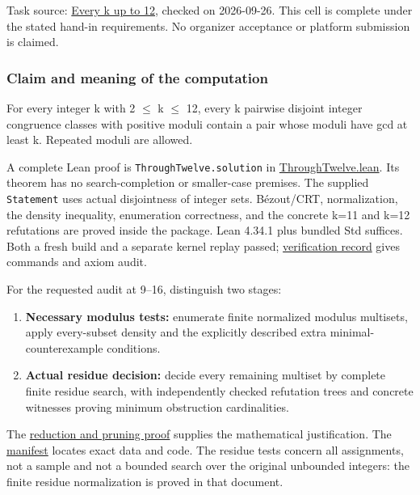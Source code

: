 \documentclass[11pt,a4paper]{article}
\providecommand{\tightlist}{\setlength{\itemsep}{0pt}\setlength{\parskip}{0pt}}
\begin{document}
Task source: \href{https://hackathon.bainsa.ai/p/p4/c4}{Every k up to 12}, checked on 2026-09-26. This cell is complete under the stated hand-in requirements. No organizer acceptance or platform submission is claimed.

\subsubsection{Claim and meaning of the computation}\label{claim-and-meaning-of-the-computation}

For every integer k with 2 \ensuremath{\leq} k \ensuremath{\leq} 12, every k pairwise disjoint integer congruence classes with positive moduli contain a pair whose moduli have gcd at least k. Repeated moduli are allowed.

A complete Lean proof is \texttt{ThroughTwelve.solution} in \href{https://github.com/mpelteshki/climbing-to-the-frontier/blob/ed55f76eb8c558825bb629fd2cd8dbf46e5f1314/cagent/p4/lean/ProofPursuit/P4/ThroughTwelve.lean}{ThroughTwelve.lean}. Its theorem has no search-completion or smaller-case premises. The supplied \texttt{Statement} uses actual disjointness of integer sets. B\'{e}zout/CRT, normalization, the density inequality, enumeration correctness, and the concrete k=11 and k=12 refutations are proved inside the package. Lean 4.34.1 plus bundled Std suffices. Both a fresh build and a separate kernel replay passed; \href{https://github.com/mpelteshki/climbing-to-the-frontier/blob/ed55f76eb8c558825bb629fd2cd8dbf46e5f1314/cagent/p4/verification.md}{verification record} gives commands and axiom audit.

For the requested audit at 9--16, distinguish two stages:

\begin{enumerate}
\def\labelenumi{\arabic{enumi}.}
\tightlist
\item
  \textbf{Necessary modulus tests:} enumerate finite normalized modulus multisets, apply every-subset density and the explicitly described extra minimal-counterexample conditions.
\item
  \textbf{Actual residue decision:} decide every remaining multiset by complete finite residue search, with independently checked refutation trees and concrete witnesses proving minimum obstruction cardinalities.
\end{enumerate}

The \href{https://github.com/mpelteshki/climbing-to-the-frontier/blob/ed55f76eb8c558825bb629fd2cd8dbf46e5f1314/cagent/p4/audit/reduction-proof.md}{reduction and pruning proof} supplies the mathematical justification. The \href{https://github.com/mpelteshki/climbing-to-the-frontier/blob/ed55f76eb8c558825bb629fd2cd8dbf46e5f1314/cagent/p4/audit/MANIFEST.md}{manifest} locates exact data and code. The residue tests concern all assignments, not a sample and not a bounded search over the original unbounded integers: the finite residue normalization is proved in that document.
\end{document}
